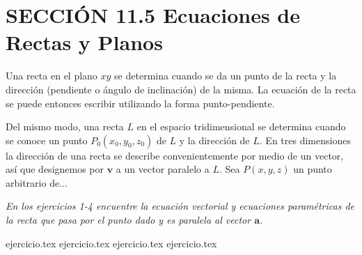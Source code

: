
\section*{SECCIÓN 11.5 \quad Ecuaciones de Rectas y Planos}

Una recta en el plano $xy$ se determina cuando se da un punto de la recta y la dirección (pendiente o ángulo de inclinación) de la misma. La ecuación de la recta se puede entonces escribir utilizando la forma punto-pendiente.

Del mismo modo, una recta $L$ en el espacio tridimensional se determina cuando se conoce un punto $P_0(x_0, y_0, z_0)$ de $L$ y la dirección de $L$. En tres dimensiones la dirección de una recta se describe convenientemente por medio de un vector, así que designemos por $\mathbf{v}$ a un vector paralelo a $L$. Sea $P(x, y, z)$ un punto arbitrario de...

\begin{center}
\end{center}

\vspace{0.5cm}
\noindent\textit{En los ejercicios 1-4 encuentre la ecuación vectorial y ecuaciones paramétricas de la recta que pasa por el punto dado y es paralela al vector $\mathbf{a}$.}

\begin{enumerate}
    {ejercicio.tex}
{ejercicio.tex}
{ejercicio.tex}
{ejercicio.tex}
\end{enumerate}

